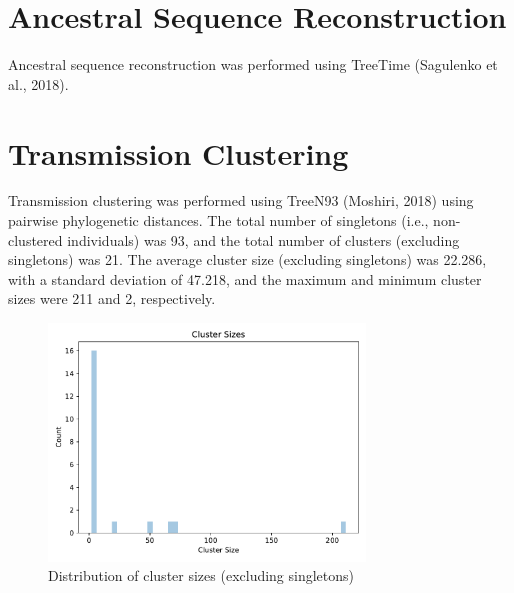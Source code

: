 \documentclass{article}
\begin{document}
\section{Ancestral Sequence Reconstruction}
Ancestral sequence reconstruction was performed using TreeTime (Sagulenko et al., 2018).
\section{Transmission Clustering}
Transmission clustering was performed using TreeN93 (Moshiri, 2018) using pairwise phylogenetic distances.
The total number of singletons (i.e., non-clustered individuals) was 93,
and the total number of clusters (excluding singletons) was 21.
The average cluster size (excluding singletons) was 22.286,
with a standard deviation of 47.218,
and the maximum and minimum cluster sizes were 211 and 2, respectively.


\begin{figure}[h]
\centering
\includegraphics[width=0.75\textwidth,keepaspectratio]{./figs/cluster_sizes.pdf}
\caption{Distribution of cluster sizes (excluding singletons)}
\end{figure}
\end{document}
